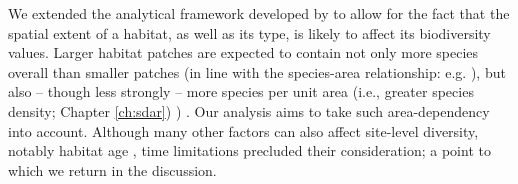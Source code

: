 We extended the analytical framework developed by \cite{Newbold:2015nat} to allow for the fact that the spatial extent of a habitat, as well as its type, is likely to affect its biodiversity values. Larger habitat patches are expected to contain not only more species overall than smaller patches (in line with the species-area relationship: e.g. \citealt{rosenzweig:1995species}), but also -- though less strongly -- more species per unit area (i.e., greater species density; 
\ifappendixStyle %
Chapter \ref{ch:sdar})%
\else
\citealt{Phillips:2015sdar})
\fi
. Our analysis aims to take such area-dependency into account. Although many other factors can also affect site-level diversity, notably habitat age \citep{Sattler:2010le}, time limitations precluded their consideration; a point to which we return in the discussion.



